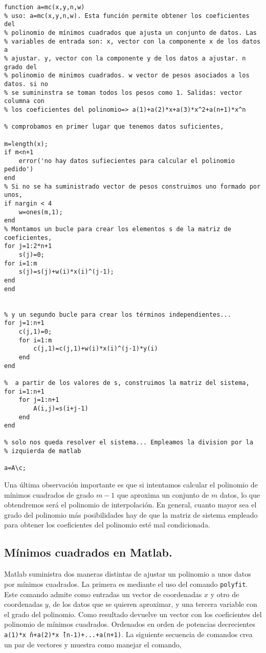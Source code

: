 \begin{lstlisting}
function a=mc(x,y,n,w)
% uso: a=mc(x,y,n,w). Esta función permite obtener los coeficientes del
% polinomio de mínimos cuadrados que ajusta un conjunto de datos. Las
% variables de entrada son: x, vector con la componente x de los datos a
% ajustar. y, vector con la componente y de los datos a ajustar. n grado del
% polinomio de minimos cuadrados. w vector de pesos asociados a los datos. si no
% se sumininstra se toman todos los pesos como 1. Salidas: vector columna con
% los coeficientes del polinomio=> a(1)+a(2)*x+a(3)*x^2+a(n+1)*x^n

% comprobamos en primer lugar que tenemos datos suficientes,

m=length(x);
if m<n+1
    error('no hay datos sufiecientes para calcular el polinomio pedido')
end
% Si no se ha suministrado vector de pesos construimos uno formado por unos,
if nargin < 4
	w=ones(m,1);
end
% Montamos un bucle para crear los elementos s de la matriz de coeficientes,
for j=1:2*n+1
    s(j)=0;    
for i=1:m
    s(j)=s(j)+w(i)*x(i)^(j-1);
end
end


% y un segundo bucle para crear los términos independientes...
for j=1:n+1
    c(j,1)=0;
    for i=1:m
        c(j,1)=c(j,1)+w(i)*x(i)^(j-1)*y(i)
    end
end

%  a partir de los valores de s, construimos la matriz del sistema,
for i=1:n+1
    for j=1:n+1
        A(i,j)=s(i+j-1)
    end
end

% solo nos queda resolver el sistema... Empleamos la division por la
% izquierda de matlab

a=A\c;
\end{lstlisting}

Una última observación importante es que si intentamos calcular el polinomio de mínimos cuadrados de grado $m-1$ que aproxima un conjunto de $m$ datos, lo que obtendremos será el polinomio de interpolación. En general, cuanto mayor sea el grado del polinomio más posibilidades hay de que la matriz de sistema empleado para obtener los coeficientes del polinomio esté mal condicionada.

\subsection{Mínimos cuadrados en Matlab.}

Matlab suministra dos maneras distintas de ajustar un polinomio a unos datos por mínimos cuadrados. La primera es mediante el uso del comando \texttt{polyfit}. Este comando admite como entradas un vector de coordenadas $x$ y otro de coordenadas $y$, de los datos que se quieren aproximar, y una tercera variable con el grado del polinomio. Como resultado devuelve un vector con los coeficientes del polinomio de mínimos cuadrados. Ordenados en orden de potencias decrecientes \texttt{a(1)*x\^\  n+a(2)*x\^\  (n-1)+...+a(n+1)}. La siguiente secuencia de comandos crea un par de vectores y muestra como manejar el comando,



